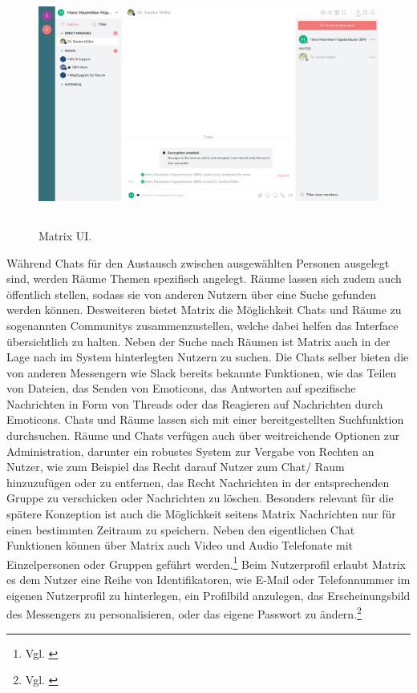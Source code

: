 \begin{figure}[htb]
    \centering
    \includegraphics[height=8cm]{graphics/unknown-3.png}
    \caption[Matrix UI]{Matrix UI.\footnotemark}
    \label{abb:UI}
\end{figure}

Während Chats für den Austausch zwischen ausgewählten Personen ausgelegt sind, werden Räume Themen spezifisch angelegt. Räume lassen sich zudem auch öffentlich stellen, sodass sie von anderen Nutzern über eine Suche gefunden werden können. Desweiteren bietet Matrix die Möglichkeit Chats und Räume zu sogenannten Communitys zusammenzustellen, welche dabei helfen das Interface übersichtlich zu halten.
Neben der Suche nach Räumen ist Matrix auch in der Lage nach im System hinterlegten Nutzern zu suchen. Die Chats selber bieten die von anderen Messengern wie Slack bereits bekannte Funktionen, wie das Teilen von Dateien, das Senden von Emoticons, das Antworten auf spezifische Nachrichten in Form von Threads oder das Reagieren auf Nachrichten durch Emoticons. Chats und Räume lassen sich mit einer bereitgestellten Suchfunktion durchsuchen. Räume und Chats verfügen auch über weitreichende Optionen zur Administration, darunter ein robustes System zur Vergabe von Rechten an Nutzer, wie zum Beispiel das Recht darauf Nutzer zum Chat/ Raum hinzuzufügen oder zu entfernen, das Recht Nachrichten in der entsprechenden Gruppe zu verschicken oder Nachrichten zu löschen. Besonders relevant für die spätere Konzeption ist auch die Möglichkeit seitens Matrix Nachrichten nur für einen bestimmten Zeitraum zu speichern.
Neben den eigentlichen Chat Funktionen können über Matrix auch Video und Audio Telefonate mit Einzelpersonen oder Gruppen geführt werden.\footnote{Vgl. \cite{Matrix.org2020}} Beim Nutzerprofil erlaubt Matrix es dem Nutzer eine Reihe von Identifikatoren, wie E-Mail oder Telefonnummer im eigenen Nutzerprofil zu hinterlegen, ein Profilbild anzulegen, das Erscheinungsbild des Messengers zu personalisieren, oder das eigene Passwort zu ändern.\footnote{Vgl. \cite{Github2020}}

